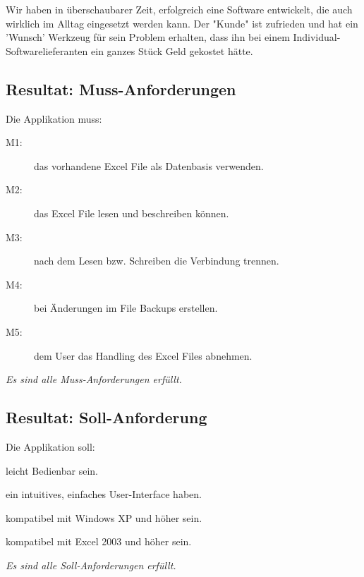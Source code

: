 \documentclass{article}
\begin{document}
Wir haben in überschaubarer Zeit, erfolgreich eine Software entwickelt, die auch wirklich im Alltag eingesetzt werden kann. Der "Kunde" ist zufrieden und hat ein 'Wunsch' Werkzeug für sein Problem erhalten, dass ihn bei einem Individual-Softwarelieferanten ein ganzes Stück Geld gekostet hätte.

\subsection{Resultat: Muss-Anforderungen}
Die Applikation muss:
	\begin{description}
		\item[M1:] das vorhandene Excel File als Datenbasis verwenden. \color{green} {}
		\color{black}\item[M2:] das Excel File lesen und beschreiben können. \color{green} {}
		\color{black}\item[M3:] nach dem Lesen bzw. Schreiben die Verbindung trennen. \color{green} {}
		\color{black}\item[M4:] bei Änderungen im File Backups erstellen. \color{green} {}
		\color{black}\item[M5:] dem User das Handling des Excel Files abnehmen. \color{green} {}
	\end{description}
\vspace{5mm}
\textit{Es sind alle Muss-Anforderungen erfüllt.}

\subsection{Resultat: Soll-Anforderung}
Die Applikation soll:
\begin{description}
	\color{black}\item[S1:] leicht Bedienbar sein. \color{green} {}
	\color{black}\item[S2:] ein intuitives, einfaches User-Interface haben. \color{green} {}
	\color{black}\item[S3:] kompatibel mit Windows XP und höher sein. \color{green} {}
	\color{black}\item[S4:] kompatibel mit Excel 2003 und höher sein. \color{green} {}
\end{description}
\vspace{5mm}
\textit{Es sind alle Soll-Anforderungen erfüllt.}
\end{document}
